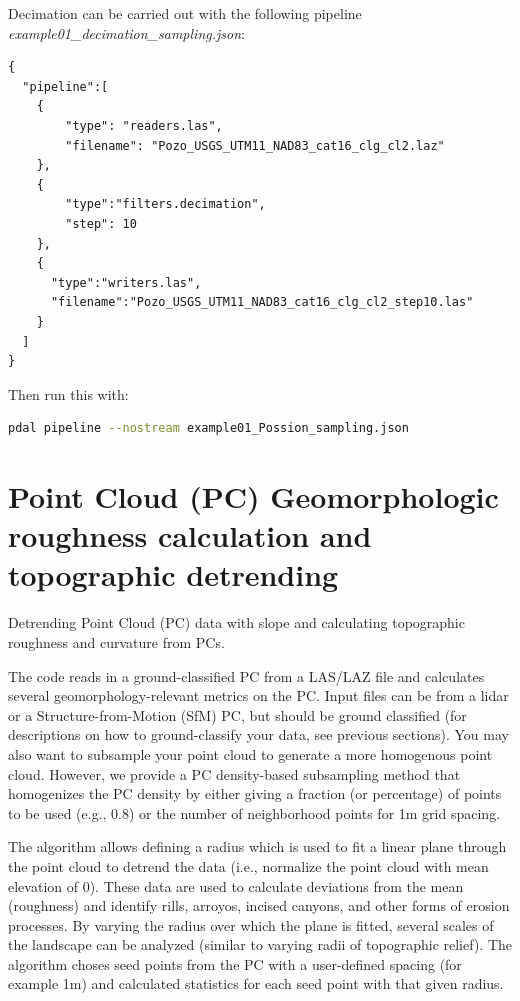 \documentclass[a4paperpaper,,tablecaptionabove]{scrartcl}
\begin{document}
Decimation can be carried out with the following pipeline
\emph{example01\_decimation\_sampling.json}:

\begin{lstlisting}
{
  "pipeline":[
    {
        "type": "readers.las",
        "filename": "Pozo_USGS_UTM11_NAD83_cat16_clg_cl2.laz"
    },
    {
        "type":"filters.decimation",
        "step": 10
    },
    {
      "type":"writers.las",
      "filename":"Pozo_USGS_UTM11_NAD83_cat16_clg_cl2_step10.las"
    }
  ]
}
\end{lstlisting}

Then run this with:

\begin{lstlisting}[language=bash]
pdal pipeline --nostream example01_Possion_sampling.json
\end{lstlisting}

\hypertarget{point-cloud-pc-geomorphologic-roughness-calculation-and-topographic-detrending}{%
\section{Point Cloud (PC) Geomorphologic roughness calculation and
topographic
detrending}\label{point-cloud-pc-geomorphologic-roughness-calculation-and-topographic-detrending}}

Detrending Point Cloud (PC) data with slope and calculating topographic
roughness and curvature from PCs.

The code reads in a ground-classified PC from a LAS/LAZ file and
calculates several geomorphology-relevant metrics on the PC. Input files
can be from a lidar or a Structure-from-Motion (SfM) PC, but should be
ground classified (for descriptions on how to ground-classify your data,
see previous sections). You may also want to subsample your point cloud
to generate a more homogenous point cloud. However, we provide a PC
density-based subsampling method that homogenizes the PC density by
either giving a fraction (or percentage) of points to be used (e.g.,
0.8) or the number of neighborhood points for 1m grid spacing.

The algorithm allows defining a radius which is used to fit a linear
plane through the point cloud to detrend the data (i.e., normalize the
point cloud with mean elevation of 0). These data are used to calculate
deviations from the mean (roughness) and identify rills, arroyos,
incised canyons, and other forms of erosion processes. By varying the
radius over which the plane is fitted, several scales of the landscape
can be analyzed (similar to varying radii of topographic relief). The
algorithm choses seed points from the PC with a user-defined spacing
(for example 1m) and calculated statistics for each seed point with that
given radius.
\end{document}
